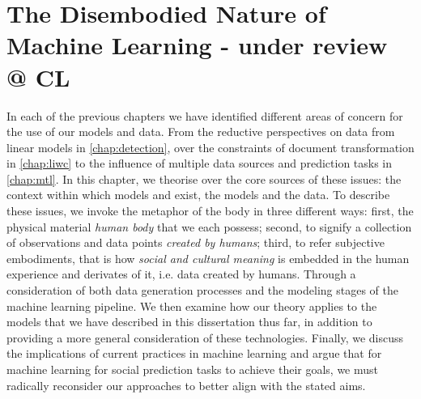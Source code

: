 \ifpdf
    \graphicspath{{Chapter8/Figs/Raster/}{Chapter8/Figs/PDF/}{Chapter8/Figs/}}
\else
    \graphicspath{{Chapter8/Figs/Vector/}{Chapter8/Figs/}}
\fi


\chapter{The Disembodied Nature of Machine Learning - under review @ CL}\label{chap:disembodied}

In each of the previous chapters we have identified different areas of concern for the use of our models and data. From the reductive perspectives on data from linear models in \autoref{chap:detection}, over the constraints of document transformation in \autoref{chap:liwc} to the influence of multiple data sources and prediction tasks in \autoref{chap:mtl}. In this chapter, we theorise over the core sources of these issues: the context within which models and exist, the models and the data.
To describe these issues, we invoke the metaphor of the body in three different ways: first, the physical material \textit{human body} that we each possess; second, to signify a collection of observations and data points \textit{created by humans}; third, to refer subjective embodiments, that is how \textit{social and cultural meaning} is embedded in the human experience and derivates of it, i.e. data created by humans.
 Through a consideration of both data generation processes and the modeling stages of the machine learning pipeline. We then examine how our theory applies to the models that we have described in this dissertation thus far, in addition to providing a more general consideration of these technologies. Finally, we discuss the implications of current practices in machine learning and argue that for machine learning for social prediction tasks to achieve their goals, we must radically reconsider our approaches to better align with the stated aims.

